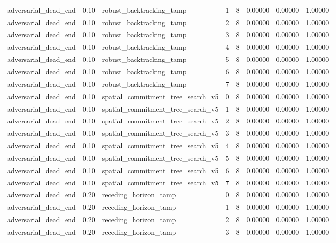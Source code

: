 \documentclass{article}
\begin{document}
\begin{table}[tbp]
{\begin{tabular}{llllllll}
adversarial\_dead\_end & 0.10 & robust\_backtracking\_tamp & 1 & 8 & 0.00000 & 0.00000 & 1.00000 \\
adversarial\_dead\_end & 0.10 & robust\_backtracking\_tamp & 2 & 8 & 0.00000 & 0.00000 & 1.00000 \\
adversarial\_dead\_end & 0.10 & robust\_backtracking\_tamp & 3 & 8 & 0.00000 & 0.00000 & 1.00000 \\
adversarial\_dead\_end & 0.10 & robust\_backtracking\_tamp & 4 & 8 & 0.00000 & 0.00000 & 1.00000 \\
adversarial\_dead\_end & 0.10 & robust\_backtracking\_tamp & 5 & 8 & 0.00000 & 0.00000 & 1.00000 \\
adversarial\_dead\_end & 0.10 & robust\_backtracking\_tamp & 6 & 8 & 0.00000 & 0.00000 & 1.00000 \\
adversarial\_dead\_end & 0.10 & robust\_backtracking\_tamp & 7 & 8 & 0.00000 & 0.00000 & 1.00000 \\
adversarial\_dead\_end & 0.10 & spatial\_commitment\_tree\_search\_v5 & 0 & 8 & 0.00000 & 0.00000 & 1.00000 \\
adversarial\_dead\_end & 0.10 & spatial\_commitment\_tree\_search\_v5 & 1 & 8 & 0.00000 & 0.00000 & 1.00000 \\
adversarial\_dead\_end & 0.10 & spatial\_commitment\_tree\_search\_v5 & 2 & 8 & 0.00000 & 0.00000 & 1.00000 \\
adversarial\_dead\_end & 0.10 & spatial\_commitment\_tree\_search\_v5 & 3 & 8 & 0.00000 & 0.00000 & 1.00000 \\
adversarial\_dead\_end & 0.10 & spatial\_commitment\_tree\_search\_v5 & 4 & 8 & 0.00000 & 0.00000 & 1.00000 \\
adversarial\_dead\_end & 0.10 & spatial\_commitment\_tree\_search\_v5 & 5 & 8 & 0.00000 & 0.00000 & 1.00000 \\
adversarial\_dead\_end & 0.10 & spatial\_commitment\_tree\_search\_v5 & 6 & 8 & 0.00000 & 0.00000 & 1.00000 \\
adversarial\_dead\_end & 0.10 & spatial\_commitment\_tree\_search\_v5 & 7 & 8 & 0.00000 & 0.00000 & 1.00000 \\
adversarial\_dead\_end & 0.20 & receding\_horizon\_tamp & 0 & 8 & 0.00000 & 0.00000 & 1.00000 \\
adversarial\_dead\_end & 0.20 & receding\_horizon\_tamp & 1 & 8 & 0.00000 & 0.00000 & 1.00000 \\
adversarial\_dead\_end & 0.20 & receding\_horizon\_tamp & 2 & 8 & 0.00000 & 0.00000 & 1.00000 \\
adversarial\_dead\_end & 0.20 & receding\_horizon\_tamp & 3 & 8 & 0.00000 & 0.00000 & 1.00000 \\
\bottomrule
\end{tabular}
}
\end{table}
\end{document}
